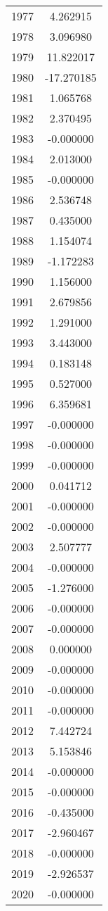 \documentclass[12pt]{article}
\begin{document}
\begin{longtable}{@{}cc@{}}
1977 & 4.262915 \\
1978 & 3.096980 \\
1979 & 11.822017 \\
1980 & -17.270185 \\
1981 & 1.065768 \\
1982 & 2.370495 \\
1983 & -0.000000 \\
1984 & 2.013000 \\
1985 & -0.000000 \\
1986 & 2.536748 \\
1987 & 0.435000 \\
1988 & 1.154074 \\
1989 & -1.172283 \\
1990 & 1.156000 \\
1991 & 2.679856 \\
1992 & 1.291000 \\
1993 & 3.443000 \\
1994 & 0.183148 \\
1995 & 0.527000 \\
1996 & 6.359681 \\
1997 & -0.000000 \\
1998 & -0.000000 \\
1999 & -0.000000 \\
2000 & 0.041712 \\
2001 & -0.000000 \\
2002 & -0.000000 \\
2003 & 2.507777 \\
2004 & -0.000000 \\
2005 & -1.276000 \\
2006 & -0.000000 \\
2007 & -0.000000 \\
2008 & 0.000000 \\
2009 & -0.000000 \\
2010 & -0.000000 \\
2011 & -0.000000 \\
2012 & 7.442724 \\
2013 & 5.153846 \\
2014 & -0.000000 \\
2015 & -0.000000 \\
2016 & -0.435000 \\
2017 & -2.960467 \\
2018 & -0.000000 \\
2019 & -2.926537 \\
2020 & -0.000000 \\

\end{longtable}
\end{document}

